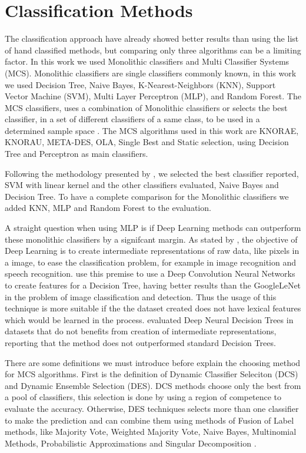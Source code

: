 \section{Classification Methods}\label{section:backgroud_classification}

The classification approach have already showed better results than using the list of hand classified methods, but comparing only three algorithms can be a limiting factor. In this work we used Monolithic classifiers and Multi Classifier Systems (MCS). Monolithic classifiers are single classifiers commonly known, in this work we used Decision Tree, Naive Bayes, K-Nearest-Neighbors (KNN), Support Vector Machine (SVM), Multi Layer Perceptron (MLP), and Random Forest. The MCS classifiers, uses a combination of Monolithic classifiers or selects the best classifier, in a set of different classifiers of a same class, to be used in a determined sample space \citep{cruz2018dynamic}. The MCS algorithms used in this work are KNORAE, KNORAU, META-DES, OLA, Single Best and Static selection, using Decision Tree and Perceptron as main classifiers.

Following the methodology presented by \cite{rasthofer2014machine}, we selected the best classifier reported, SVM with linear kernel and the other classifiers evaluated, Naive Bayes and Decision Tree. To have a complete comparison for the Monolithic classifiers we added KNN, MLP and Random Forest to the evaluation.

A straight question when using MLP is if Deep Learning methods can outperform these monolithic classifiers by a signifcant margin. As stated by \cite{lecun2015deep}, the objective of Deep Learning is to create intermediate representations of raw data, like pixels in a image, to ease the classification problem, for example in image recognition and speech recognition. \cite{kontschieder2015deep} use this premise to use a Deep Convolution Neural Networks to create features for a Decision Tree, having better results than the GoogleLeNet \citep{szegedy2015going} in the problem of image classification and detection. Thus the usage of this technique is more suitable if the the dataset created does not have lexical features which would be learned in the process. \cite{yang2018deep} evaluated Deep Neural Decision Trees in datasets that do not benefits from creation of intermediate representations, reporting that the method does not outperformed standard Decision Trees.

There are some definitions we must introduce before explain the choosing method for MCS algorithms. First is the definition of Dynamic Classifier Seleciton (DCS) and Dynamic Ensemble Selection (DES). DCS methods choose only the best from a pool of classifiers, this selection is done by using a region of competence to evaluate the accuracy. Otherwise, DES techniques selects more than one classifier to make the prediction and can combine them using methods of Fusion of Label methods, like Majority Vote, Weighted Majority Vote, Naive Bayes, Multinomial Methods, Probabilistic Approximations and Singular Decomposition \citep{kuncheva2004combining}.

